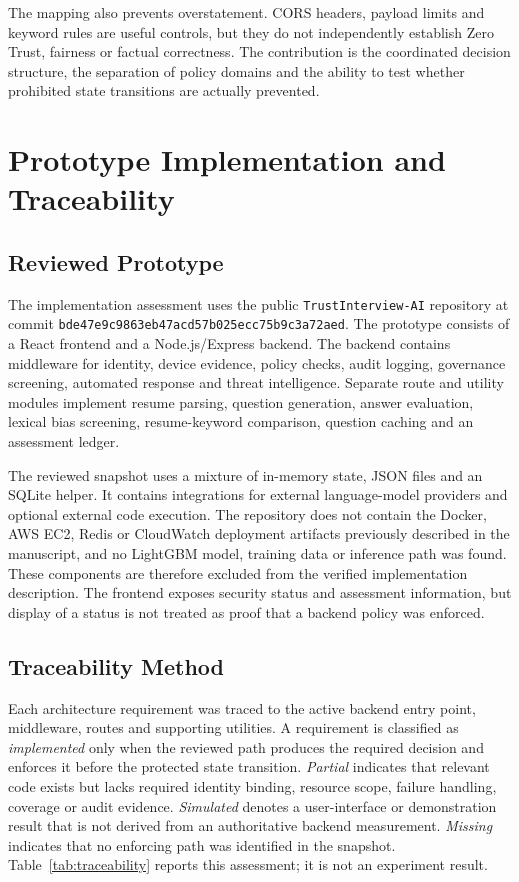 \documentclass[conference]{IEEEtran}
\begin{document}
The mapping also prevents overstatement. CORS headers, payload limits and keyword rules are useful controls, but they do not independently establish Zero Trust, fairness or factual correctness. The contribution is the coordinated decision structure, the separation of policy domains and the ability to test whether prohibited state transitions are actually prevented.

\section{Prototype Implementation and Traceability}

\subsection{Reviewed Prototype}

The implementation assessment uses the public \texttt{TrustInterview-AI} repository at commit \texttt{bde47e9c9863eb47acd57b025ecc75b9c3a72aed}. The prototype consists of a React frontend and a Node.js/Express backend. The backend contains middleware for identity, device evidence, policy checks, audit logging, governance screening, automated response and threat intelligence. Separate route and utility modules implement resume parsing, question generation, answer evaluation, lexical bias screening, resume-keyword comparison, question caching and an assessment ledger.

The reviewed snapshot uses a mixture of in-memory state, JSON files and an SQLite helper. It contains integrations for external language-model providers and optional external code execution. The repository does not contain the Docker, AWS EC2, Redis or CloudWatch deployment artifacts previously described in the manuscript, and no LightGBM model, training data or inference path was found. These components are therefore excluded from the verified implementation description. The frontend exposes security status and assessment information, but display of a status is not treated as proof that a backend policy was enforced.

\subsection{Traceability Method}

Each architecture requirement was traced to the active backend entry point, middleware, routes and supporting utilities. A requirement is classified as \emph{implemented} only when the reviewed path produces the required decision and enforces it before the protected state transition. \emph{Partial} indicates that relevant code exists but lacks required identity binding, resource scope, failure handling, coverage or audit evidence. \emph{Simulated} denotes a user-interface or demonstration result that is not derived from an authoritative backend measurement. \emph{Missing} indicates that no enforcing path was identified in the snapshot. Table~\ref{tab:traceability} reports this assessment; it is not an experiment result.
\end{document}
